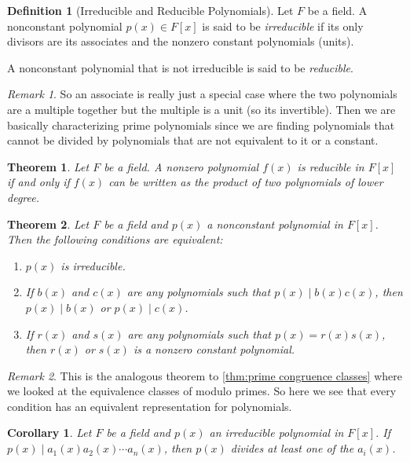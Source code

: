 \documentclass{article}
\newtheorem{theorem}{Theorem}[section]
\newtheorem{corollary}{Corollary}[section]
\theoremstyle{definition}
\newtheorem{definition}{Definition}[section]
\theoremstyle{remark}
\newtheorem{remark}{Remark}[section]
\begin{document}
\begin{definition}[Irreducible and Reducible Polynomials]
Let $F$ be a field. A nonconstant polynomial $p(x) \in F[x]$ is said to be \textit{irreducible} if its only divisors are its associates and the nonzero constant polynomials (units). 

A nonconstant polynomial that is not irreducible is said to be \textit{reducible}.
\end{definition}
\begin{remark}
So an associate is really just a special case where the two polynomials are 
a multiple together but the multiple is a unit (so its invertible). Then we are basically
characterizing prime polynomials since we are finding polynomials that cannot be divided by polynomials that are
not equivalent to it or a constant. 
\end{remark}


\begin{theorem} \label{thm:reducibility criterion}
Let $F$ be a field. A nonzero polynomial $f(x)$ is \textit{reducible} in $F[x]$ if and only if $f(x)$ can be written as the product of two polynomials of lower degree.
\end{theorem}


\begin{theorem} \label{thm:irreducibility conditions}
Let $F$ be a field and $p(x)$ a nonconstant polynomial in $F[x]$. Then the following conditions are equivalent:
\begin{enumerate}
\item $p(x)$ is irreducible.
\item If $b(x)$ and $c(x)$ are any polynomials such that $p(x) \mid b(x)c(x)$, then $p(x) \mid b(x)$ or $p(x) \mid c(x)$.
\item If $r(x)$ and $s(x)$ are any polynomials such that $p(x) = r(x)s(x)$, then $r(x)$ or $s(x)$ is a nonzero constant polynomial.
\end{enumerate}
\end{theorem}
\begin{remark}
This is the analogous theorem to \ref{thm:prime congruence classes} where we looked
at the equivalence classes of modulo primes. So here we see that every condition has an equivalent
representation for polynomials. 
\end{remark}







\begin{corollary} \label{cor:irreducible polynomial divisibility}
Let $F$ be a field and $p(x)$ an irreducible polynomial in $F[x]$. If $p(x) \mid a_1(x) a_2(x) \cdots a_n(x)$, then $p(x)$ divides at least one of the $a_i(x)$.
\end{corollary}
\end{document}
